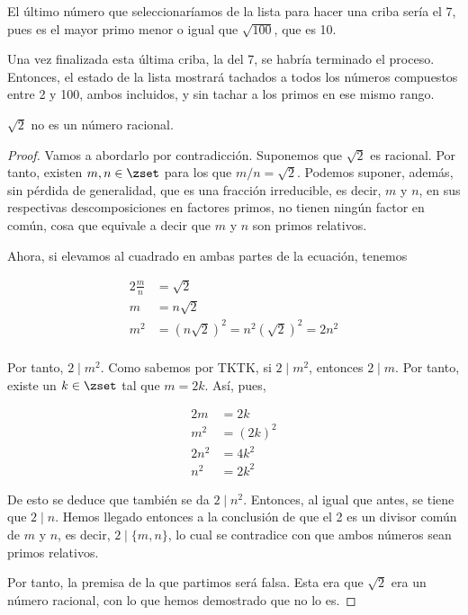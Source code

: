 El último número que seleccionaríamos de la lista para hacer una criba sería
el 7, pues es el mayor primo menor o igual que $\sqrt{100}$, que es 10.

Una vez finalizada esta última criba, la del 7, se habría terminado el
proceso. Entonces, el estado de la lista mostrará tachados a todos los
números compuestos entre 2 y 100, ambos incluidos, y sin tachar a los primos
en ese mismo rango.

\begin{theorem}
  $\sqrt{2}$ no es un número racional.
\end{theorem}


\begin{proof}
  Vamos a abordarlo por contradicción. Suponemos que $\sqrt{2}$ es racional.
  Por tanto, existen $m, n \in \zset$ para los que $m/n = \sqrt{2}$. Podemos
  suponer, además, sin pérdida de generalidad, que es una fracción
  irreducible, es decir, $m$ y $n$, en sus respectivas descomposiciones en
  factores primos, no tienen ningún factor en común, cosa que equivale a
  decir que $m$ y $n$ son primos relativos.

  Ahora, si elevamos al cuadrado en ambas partes de la ecuación, tenemos

  \begin{alignat*}{2}
    \frac{m}{n} &= \sqrt{2} \\
    m           &= n \sqrt{2} \\
    m^2
      &= \left(n \sqrt{2}\right)^2 = n^2 \left(\sqrt{2}\right)^2 = 2n^2 \\
  \end{alignat*}

  Por tanto, $2 \mid m^2$. Como sabemos por TKTK, si $2 \mid m^2$, entonces
  $2 \mid m$. Por tanto, existe un $k \in \zset$ tal que $m = 2k$. Así,
  pues,

  \begin{alignat*}{2}
    m     &= 2k \\
    m^2   &= (2k)^2 \\
    2n^2  &= 4k^2 \\
    n^2   &= 2k^2
  \end{alignat*}

  De esto se deduce que también se da $2 \mid n^2$. Entonces, al igual que
  antes, se tiene que $2 \mid n$. Hemos llegado entonces a la conclusión de
  que el 2 es un divisor común de $m$ y $n$, es decir, $2 \mid \{m, n\}$, lo
  cual se contradice con que ambos números sean primos relativos.

  Por tanto, la premisa de la que partimos será falsa. Esta era que
  $\sqrt{2}$ era un número racional, con lo que hemos demostrado que no lo
  es.
\end{proof}

